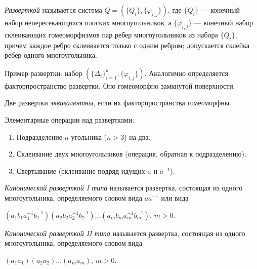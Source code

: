 \documentclass[12pt,a4paper]{article}
\begin{document}
    \begin{definition}
        \emph{Разверткой} называется система $Q = (\{Q_i\}, \{\varphi_{i,j}\})$, где $\{Q_i\}$ --- конечный набор непересекающихся плоских многоугольников, а $\{\varphi_{i, j}\}$ --- конечный набор склеивающих гомеоморфизмов пар ребер многоугольников из набора $\{Q_i\}$, причем каждое ребро склеивается только с одним ребром; допускается склейка ребер одного многоугольника.
    \end{definition}

    \begin{remark*}
        Пример развертки: набор $(\{\Delta_i\}_{i=1}^k, \{\varphi_{i,j}\})$. Аналогично определяется факторпространство развертки. Оно гомеоморфно замкнутой поверхности.
    \end{remark*}

    \begin{definition}
        Две развертки \emph{эквивалентны}, если их факторпространства гомеоморфны.
    \end{definition}

    \begin{remark}
        Элементарные операции над развертками:
        \begin{enumerate}
            \item Подразделение $n$-угольника ($n > 3$) на два.
            \item Склеивание двух многоугольников (операция, обратная к подразделению).
            \item Свертывание (склеивание подряд идущих $a$ и $a^{-1}$).
        \end{enumerate}
    \end{remark}

    \begin{definition}
        \emph{Канонической разверткой I типа} называется развертка, состоящая из одного многоугольника, определяемого словом вида $aa^{-1}$ или вида
        \begin{center}
            $(a_1 b_1 a_1^{-1} b_1^{-1}) (a_2 b_2 a_2^{-1} b_2^{-1}) \dots (a_m b_m a_m^{-1} b_m^{-1})$, $m > 0$.
        \end{center}

        \emph{Канонической разверткой II типа} называется развертка, состоящая из одного многоугольника, определяемого словом вида
        \begin{center}
            $(a_1 a_1) (a_2 a_2) \dots (a_m a_m)$, $m > 0$.
        \end{center}
    \end{definition}
\end{document}
